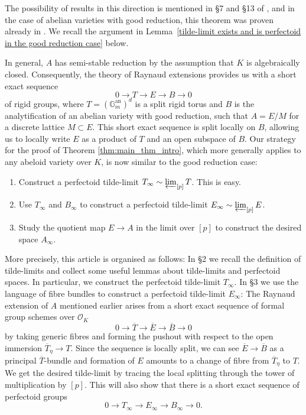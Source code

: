 \documentclass[10pt,oneside]{amsart}
\theoremstyle{definition}
\renewcommand{\O}{\mathcal{O}}
\begin{document}
The possibility of results in this direction is mentioned in \S 7 and \S 13 of \cite{scholzeICMproceedings}, and in the case of abelian varieties with good reduction, this theorem was proven already in \cite[Lemme~A.16]{Pilloni-Stroh}. We recall the argument in Lemma~\ref{tilde-limit exists and is perfectoid in the good reduction case} below. 

In general, $A$ has semi-stable reduction by the assumption that $K$ is algebraically closed.
Consequently, the theory of Raynaud extensions provides us with a short exact sequence 
\[ 0 \rightarrow T \rightarrow E  \rightarrow  B  \rightarrow  0\]
of rigid groups, where $T = (\mathbb G_m^{\text{an}})^{d}$ is a split rigid torus and $B$ is the analytification of an abelian variety with good reduction, such that $A = E/M$ for a discrete lattice $M \subset E$. This short exact sequence is split locally on $B$, allowing us to locally write $E$ as a product of $T$ and an open subspace of $B$.
Our strategy for the proof of Theorem \ref{thm:main_thm_intro}, which more generally applies to any abeloid variety over $K$, is now similar to the good reduction case:
\begin{enumerate}
\item Construct a perfectoid tilde-limit $T_\infty\sim\varprojlim_{[p]} T$. This is easy.
\item Use $T_\infty$ and $B_\infty$ to construct a perfectoid tilde-limit $E_\infty\sim\varprojlim_{[p]} E$.
\item Study the quotient map $E\rightarrow A$ in the limit over $[p]$ to construct the desired space $A_\infty$.
\end{enumerate}

More precisely, this article is organised as follows: In \S2 we recall the definition of tilde-limits and collect some useful lemmas about tilde-limits and perfectoid spaces. In particular, we construct the perfectoid tilde-limit $T_\infty$. In \S3 we use the language of fibre bundles to construct a perfectoid tilde-limit $E_\infty$: The Raynaud extension of $A$ mentioned earlier arises from a short exact sequence of formal group schemes over $\O_K$
\[0\rightarrow \overline{T}\rightarrow \overline{E}\rightarrow \overline{B}\rightarrow 0\]
by taking generic fibres and forming the pushout with respect to the open immersion $\overline{T}_\eta\rightarrow T$. Since the sequence is locally split, we can see $\overline{E}\rightarrow \overline{B}$ as a principal $\overline{T}$-bundle and formation of $E$ amounts to a change of fibre from $\overline{T}_\eta$ to $T$. We get the desired tilde-limit by tracing the local splitting through the tower of multiplication by $[p]$. This will also show that there is a short exact sequence of perfectoid groups
\[ 0\to T_\infty \to E_\infty \to B_\infty \to 0.\]
\end{document}
